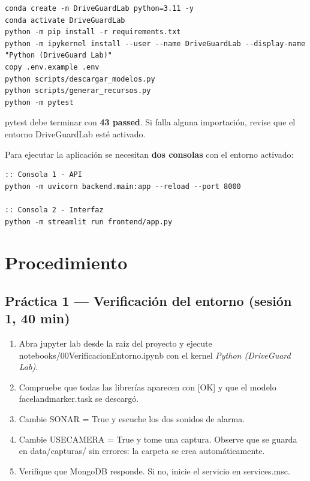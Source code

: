 \documentclass[11pt,a4paper]{article}
\newcommand{\codigoguion}{\textunderscore\allowbreak}
\newcommand{\codigo}[1]{{\small\ttfamily\let\_\codigoguion #1}}
\begin{document}
\begin{lstlisting}
conda create -n DriveGuardLab python=3.11 -y
conda activate DriveGuardLab
python -m pip install -r requirements.txt
python -m ipykernel install --user --name DriveGuardLab --display-name "Python (DriveGuard Lab)"
copy .env.example .env
python scripts/descargar_modelos.py
python scripts/generar_recursos.py
python -m pytest
\end{lstlisting}

\begin{verificacion}
\codigo{pytest} debe terminar con \textbf{43 passed}. Si falla alguna importación, revise que el entorno
\codigo{DriveGuardLab} esté activado.
\end{verificacion}

Para ejecutar la aplicación se necesitan \textbf{dos consolas} con el entorno activado:
\begin{lstlisting}
:: Consola 1 - API
python -m uvicorn backend.main:app --reload --port 8000

:: Consola 2 - Interfaz
python -m streamlit run frontend/app.py
\end{lstlisting}

\section{Procedimiento}

\subsection{Práctica 1 — Verificación del entorno (sesión 1, 40 min)}
\begin{enumerate}
  \item Abra \codigo{jupyter lab} desde la raíz del proyecto y ejecute
        \codigo{notebooks/00\_Verificacion\_Entorno.ipynb} con el kernel \emph{Python (DriveGuard Lab)}.
  \item Compruebe que todas las librerías aparecen con \codigo{[OK]} y que el modelo
        \codigo{face\_landmarker.task} se descargó.
  \item Cambie \codigo{SONAR = True} y escuche los dos sonidos de alarma.
  \item Cambie \codigo{USE\_CAMERA = True} y tome una captura. Observe que se guarda en
        \codigo{data/capturas/} sin errores: la carpeta se crea automáticamente.
  \item Verifique que MongoDB responde. Si no, inicie el servicio en \codigo{services.msc}.
\end{enumerate}
\end{document}
